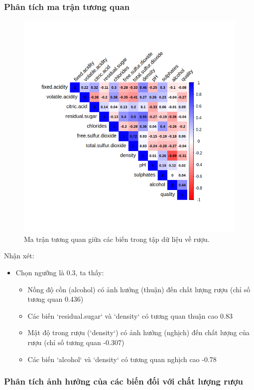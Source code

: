 \subsubsection{Phân tích ma trận tương quan}

\begin{figure}[H]
    \centering
    \includegraphics[width=0.75\columnwidth]{wine_colors/wine_corr.png}
    \caption{Ma trận tương quan giữa các biến trong tập dữ liệu về rượu.}
    \label{fig:wine_corr}
\end{figure}
Nhận xét:
\begin{itemize}
    \item Chọn ngưỡng là 0.3, ta thấy:
    \begin{itemize}
        \item Nồng độ cồn (alcohol) có ảnh hưởng (thuận) đến chất lượng rượu (chỉ số tương quan 0.436)
        \item Các biến `residual.sugar` và `density` có tương quan thuận cao 0.83
        \item Mật độ trong rượu (`density`) có ảnh hưởng (nghịch) đến chất lượng của rượu (chỉ số tương quan -0.307)
        \item Các biến `alcohol` và `density` có tương quan nghịch cao -0.78
    \end{itemize}
\end{itemize}

\subsubsection{Phân tích ảnh hưởng của các biến đối với chất lượng rượu}

